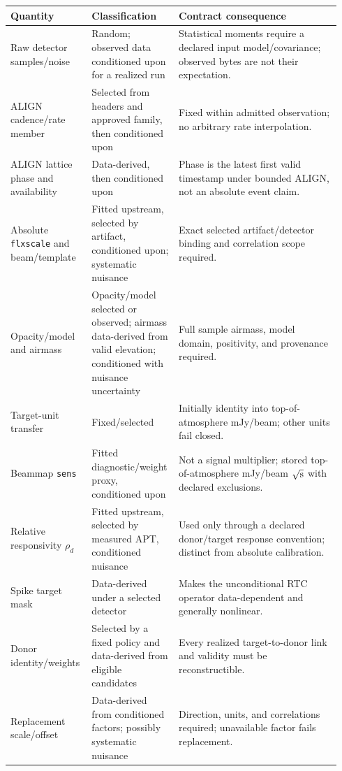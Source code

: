 \documentclass[11pt]{article}
\newcommand{\code}[1]{\nolinkurl{#1}}
\begin{document}
\begin{longtable}{@{}p{0.24\linewidth}p{0.22\linewidth}p{0.48\linewidth}@{}}
\toprule
Quantity & Classification & Contract consequence \\
\midrule
Raw detector samples/noise & Random; observed data conditioned upon for a realized run & Statistical moments require a declared input model/covariance; observed bytes are not their expectation. \\
ALIGN cadence/rate member & Selected from headers and approved family, then conditioned upon & Fixed within admitted observation; no arbitrary rate interpolation. \\
ALIGN lattice phase and availability & Data-derived, then conditioned upon & Phase is the latest first valid timestamp under bounded ALIGN, not an absolute event claim. \\
Absolute \code{flxscale} and beam/template & Fitted upstream, selected by artifact, conditioned upon; systematic nuisance & Exact selected artifact/detector binding and correlation scope required. \\
Opacity/model and airmass & Opacity/model selected or observed; airmass data-derived from valid elevation; conditioned with nuisance uncertainty & Full sample airmass, model domain, positivity, and provenance required. \\
Target-unit transfer & Fixed/selected & Initially identity into top-of-atmosphere mJy/beam; other units fail closed. \\
Beammap \code{sens} & Fitted diagnostic/weight proxy, conditioned upon & Not a signal multiplier; stored top-of-atmosphere mJy/beam $\sqrt{\rm s}$ with declared exclusions. \\
Relative responsivity $\rho_d$ & Fitted upstream, selected by measured APT, conditioned nuisance & Used only through a declared donor/target response convention; distinct from absolute calibration. \\
Spike target mask & Data-derived under a selected detector & Makes the unconditional RTC operator data-dependent and generally nonlinear. \\
Donor identity/weights & Selected by a fixed policy and data-derived from eligible candidates & Every realized target-to-donor link and validity must be reconstructible. \\
Replacement scale/offset & Data-derived from conditioned factors; possibly systematic nuisance & Direction, units, and correlations required; unavailable factor fails replacement. \\

\end{longtable}
\end{document}
